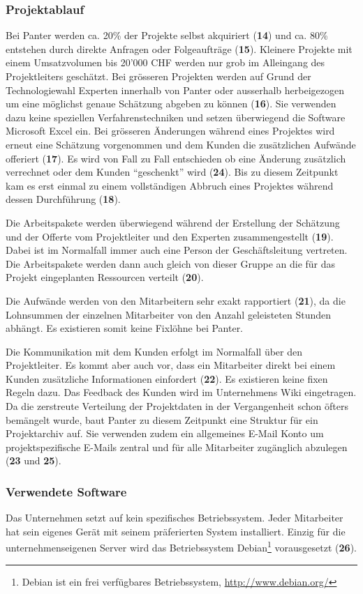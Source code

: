 \subsubsection{Projektablauf}
Bei Panter werden ca. 20\% der Projekte selbst akquiriert (\textbf{14}) und ca.
80\% entstehen durch direkte Anfragen oder Folgeaufträge (\textbf{15}). Kleinere
Projekte mit einem Umsatzvolumen bis 20'000 CHF werden nur grob im Alleingang
des Projektleiters geschätzt. Bei grösseren Projekten werden auf Grund der
Technologiewahl Experten innerhalb von Panter oder ausserhalb herbeigezogen
um eine möglichst genaue Schätzung abgeben zu können (\textbf{16}). Sie verwenden
dazu keine speziellen Verfahrenstechniken und setzen überwiegend die Software
Microsoft Excel ein. Bei grösseren Änderungen während eines Projektes wird
erneut eine Schätzung vorgenommen und dem Kunden die zusätzlichen Aufwände
offeriert (\textbf{17}). Es wird von Fall zu Fall entschieden ob eine Änderung 
zusätzlich verrechnet oder dem Kunden ``geschenkt'' wird (\textbf{24}). Bis zu 
diesem Zeitpunkt kam es erst einmal zu einem vollständigen Abbruch eines Projektes 
während dessen Durchführung (\textbf{18}).

Die Arbeitspakete werden überwiegend während der Erstellung der Schätzung und 
der Offerte vom Projektleiter und den Experten zusammengestellt (\textbf{19}).
Dabei ist im Normalfall immer auch eine Person der Geschäftsleitung vertreten.
Die Arbeitspakete werden dann auch gleich von dieser Gruppe an die für das 
Projekt eingeplanten Ressourcen verteilt (\textbf{20}).

Die Aufwände werden von den Mitarbeitern sehr exakt rapportiert (\textbf{21}),
da die Lohnsummen der einzelnen Mitarbeiter von den Anzahl geleisteten Stunden
abhängt. Es existieren somit keine Fixlöhne bei Panter.

Die Kommunikation mit dem Kunden erfolgt im Normalfall über den Projektleiter.
Es kommt aber auch vor, dass ein Mitarbeiter direkt bei einem Kunden zusätzliche
Informationen einfordert (\textbf{22}). Es existieren keine fixen Regeln dazu.
Das Feedback des Kunden wird im Unternehmens Wiki eingetragen. Da die zerstreute
Verteilung der Projektdaten in der Vergangenheit schon öfters bemängelt wurde, 
baut Panter zu diesem Zeitpunkt eine Struktur für ein Projektarchiv auf. Sie
verwenden zudem ein allgemeines E-Mail Konto um projektspezifische E-Mails
zentral und für alle Mitarbeiter zugänglich abzulegen (\textbf{23} und \textbf{25}).

\subsubsection{Verwendete Software}
Das Unternehmen setzt auf kein spezifisches Betriebssystem. Jeder Mitarbeiter
hat sein eigenes Gerät mit seinem präferierten System installiert. Einzig für
die unternehmenseigenen Server wird das Betriebssystem Debian\footnote{Debian 
ist ein frei verfügbares Betriebssystem, \url{http://www.debian.org/}} 
vorausgesetzt (\textbf{26}).

